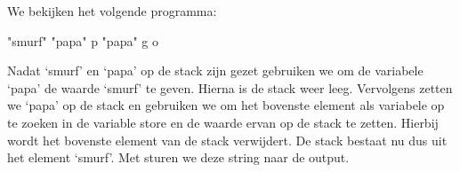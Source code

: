 \begin{exmp}
	We bekijken het volgende programma:
	\begin{smurf}"smurf" "papa" p "papa" g o\end{smurf}
	Nadat `smurf' en `papa' op de stack zijn gezet gebruiken we 
	om de variabele `papa' de waarde `smurf' te geven. Hierna is de stack weer
	leeg. Vervolgens zetten we `papa' op de stack en gebruiken we 
	om het bovenste element als variabele op te zoeken in de variable store en de
	waarde ervan op de stack te zetten. Hierbij wordt het bovenste element van de stack verwijdert. De stack bestaat nu dus uit het element
	`smurf'. Met  sturen we deze string naar de output.
\end{exmp}





